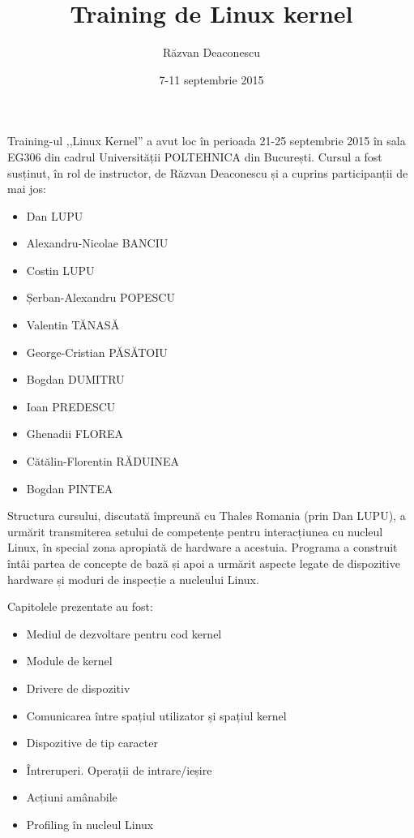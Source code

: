 \documentclass[12pt]{article}
\title{Training de Linux kernel}
\author{Răzvan Deaconescu}
\date{7-11 septembrie 2015}
\begin{document}
\maketitle

Training-ul ,,Linux Kernel'' a avut loc în perioada 21-25 septembrie 2015 în sala EG306 din cadrul Universității POLTEHNICA din București. Cursul a fost susținut, în rol de instructor, de Răzvan Deaconescu și a cuprins participanții de mai jos:

\begin{itemize}
  \item Dan LUPU
  \item Alexandru-Nicolae BANCIU
  \item Costin LUPU
  \item Șerban-Alexandru POPESCU
  \item Valentin TĂNASĂ
  \item George-Cristian PĂSĂTOIU
  \item Bogdan DUMITRU
  \item Ioan PREDESCU
  \item Ghenadii FLOREA
  \item Cătălin-Florentin RĂDUINEA
  \item Bogdan PINTEA
\end{itemize}

Structura cursului, discutată împreună cu Thales Romania (prin Dan LUPU), a urmărit transmiterea setului de competențe pentru interacțiunea cu nucleul Linux, în special zona apropiată de hardware a acestuia. Programa a construit întâi partea de concepte de bază și apoi a urmărit aspecte legate de dispozitive hardware și moduri de inspecție a nucleului Linux.

Capitolele prezentate au fost:

\begin{itemize}
  \item Mediul de dezvoltare pentru cod kernel
  \item Module de kernel
  \item Drivere de dispozitiv
  \item Comunicarea între spațiul utilizator și spațiul kernel
  \item Dispozitive de tip caracter
  \item Întreruperi. Operații de intrare/ieșire
  \item Acțiuni amânabile
  \item Profiling în nucleul Linux
\end{itemize}
\end{document}
